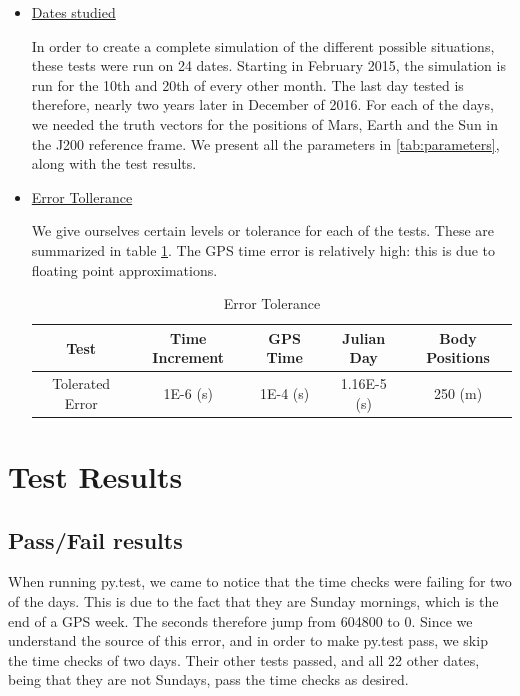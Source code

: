 \documentclass[]{BasiliskReportMemo}
\begin{document}
\begin{itemize}
\item \underline{Dates studied}

In order to create a complete simulation of the different possible situations, these tests were run on 24 dates. Starting in February 2015, the simulation is run for the 10th and 20th of every other month. The last day tested is therefore, nearly two years later in December of 2016. For each of the days, we needed the truth vectors for the positions of Mars, Earth and the Sun in the J200 reference frame. We present all the parameters in \ref{tab:parameters}, along with the test results. 
\item \underline{Error Tollerance}

We give ourselves certain levels or tolerance for each of the tests. These are summarized in table \ref{tab:errortol}. The GPS time error is relatively high: this is due to floating point approximations. 

\begin{table}[htbp]
    \caption{Error Tolerance}
   \label{tab:errortol}
        \centering \fontsize{10}{10}\selectfont
   \begin{tabular}{c | c | c | c | c |} %
      \hline
      Test   & Time Increment &GPS Time& Julian Day & Body Positions \\
      \hline
      Tolerated Error & 1E-6 (s) & 1E-4 (s) & 1.16E-5 (s) & 250 (m) \\
      \hline
   \end{tabular}
\end{table}

\end{itemize}

\section{Test Results}

\subsection{Pass/Fail results}

When running py.test, we came to notice that the time checks were failing for two of the days. This is due to the fact that they are Sunday mornings, which is the end of a GPS week. The seconds therefore jump from 604800 to 0. Since we understand the source of this error, and in order to make py.test pass, we skip the time checks of two days. Their other tests passed, and all 22 other dates, being that they are not Sundays, pass the time checks as desired. 
\end{document}
